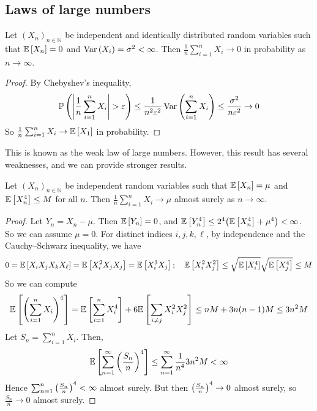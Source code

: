 \subsection{Laws of large numbers}
\begin{proposition}
	Let \( (X_n)_{n \in \mathbb N} \) be independent and identically distributed random variables such that \( \mathbb{E}\left[{X_n}\right] = 0 \) and \( \operatorname{Var}\left({X_i}\right) = \sigma^2 < \infty \).
	Then \( \frac{1}{n} \sum_{i=1}^n X_i \to 0 \) in probability as \( n \to \infty \).
\end{proposition}
\begin{proof}
	By Chebyshev's inequality,
	\[ \mathbb{P}\left({\abs{\frac{1}{n}\sum_{i=1}^n X_i} > \varepsilon}\right) \leq \frac{1}{n^2 \varepsilon^2} \operatorname{Var}\left({\sum_{i=1}^n X_i}\right) \leq \frac{\sigma^2}{n\varepsilon^2} \to 0 \]
	So \( \frac{1}{n} \sum_{i=1}^n X_i \to \mathbb{E}\left[{X_1}\right] \) in probability.
\end{proof}
This is known as the weak law of large numbers.
However, this result has several weaknesses, and we can provide stronger results.
\begin{proposition}
	Let \( (X_n)_{n \in \mathbb N} \) be independent random variables such that \( \mathbb{E}\left[{X_n}\right] = \mu \) and \( \mathbb{E}\left[{X_n^4}\right] \leq M \) for all \( n \).
	Then \( \frac{1}{n} \sum_{i=1}^n X_i \to \mu \) almost surely as \( n \to \infty \).
\end{proposition}
\begin{proof}
	Let \( Y_n = X_n - \mu \).
	Then \( \mathbb{E}\left[{Y_n}\right] = 0 \), and \( \mathbb{E}\left[{Y_n^4}\right] \leq 2^4 \qty(\mathbb{E}\left[{X_n^4}\right] + \mu^4) < \infty \).
	So we can assume \( \mu = 0 \).
	For distinct indices \( i, j, k, \ell \), by independence and the Cauchy--Schwarz inequality, we have
	\[ 0 = \mathbb{E}\left[{X_i X_j X_k X_\ell}\right] = \mathbb{E}\left[{X_i^2 X_j X_j}\right] = \mathbb{E}\left[{X_i^3 X_j}\right];\quad \mathbb{E}\left[{X_i^2 X_j^2}\right] \leq \sqrt{\mathbb{E}\left[{X_i^4}\right]}\sqrt{\mathbb{E}\left[{X_j^4}\right]} \leq M \]
	So we can compute
	\[ \mathbb{E}\left[{\qty(\sum_{i=1}^n X_i)^4}\right] = \mathbb{E}\left[{\sum_{i=1}^n X_i^4}\right] + 6\mathbb{E}\left[{\sum_{i \neq j} X_i^2 X_j^2}\right] \leq nM + 3n(n-1)M \leq 3n^2 M \]
	Let \( S_n = \sum_{i=1}^n X_i \).
	Then,
	\[ \mathbb{E}\left[{\sum_{n=1}^\infty \qty(\frac{S_n}{n})^4}\right] \leq \sum_{n=1}^\infty \frac{1}{n^4} 3n^2 M < \infty \]
	Hence \( \sum_{n=1}^n \qty(\frac{S_n}{n})^4 < \infty \) almost surely.
	But then \( \qty(\frac{S_n}{n})^4 \to 0 \) almost surely, so \( \frac{S_n}{n} \to 0 \) almost surely.
\end{proof}

